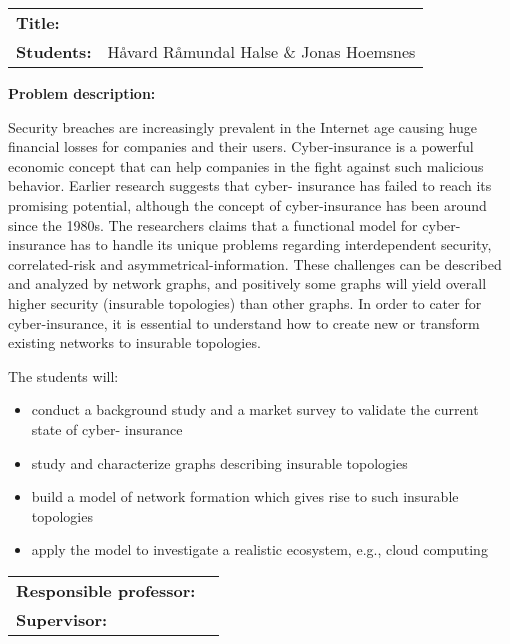 \begin{titlingpage}

\noindent
\begin{tabular}{@{}p{4cm}l}
\textbf{Title:} 	& \thetitle \\
\textbf{Students:}	& Håvard Råmundal Halse \& Jonas Hoemsnes \\
\end{tabular}

\vspace{4ex}
\noindent\textbf{Problem description:}

Security breaches are increasingly prevalent in the Internet age causing huge financial losses
for companies and their users. Cyber-insurance is a powerful economic concept that can help
companies in the fight against such malicious behavior. Earlier research suggests that cyber-
insurance has failed to reach its promising potential, although the concept of cyber-insurance has
been around since the 1980s. The researchers claims that a functional model for cyber-insurance has to handle its unique problems regarding interdependent security, correlated-risk and asymmetrical-information. These challenges can be described and analyzed by network graphs, and positively some graphs will yield overall higher security (insurable topologies) than other graphs. In order to cater for cyber-insurance, it is essential to understand how to create new or transform existing networks to insurable topologies.

The students will:
\begin{itemize}

\item conduct a background study and a market survey to validate the current state of cyber-
insurance
\item study and characterize graphs describing insurable topologies
\item build a model of network formation which gives rise to such insurable topologies
\item apply the model to investigate a realistic ecosystem, e.g., cloud computing

\end{itemize}
\vspace{2ex}

\noindent
\begin{tabular}{@{}p{4cm}l}
\textbf{Responsible professor:} 	& \theprofessor \\
\textbf{Supervisor:}			& \thesupervisor \\
\end{tabular}

\end{titlingpage}